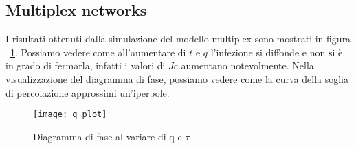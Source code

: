 \subsection{Multiplex networks}\label{subsec:res-multiplex-networks}
    I risultati ottenuti dalla simulazione del modello multiplex sono mostrati in figura ~\ref{fig:diagram_phase}.
    Possiamo vedere come all'aumentare di $t$ e $q$ l'infezione si diffonde e non si è in grado di fermarla, infatti i
    valori di $Jc$ aumentano notevolmente.
    Nella visualizzazione del diagramma di fase, possiamo vedere come la curva della soglia di percolazione approssimi 
    un'iperbole.

    \begin{figure}[h]
        \texttt{[image: q\_plot]}\label{fig:diagram_phase}
        \caption{Diagramma di fase al variare di q e $\tau$}
    \end{figure}

